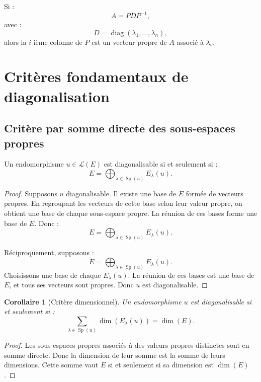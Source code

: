 \documentclass[11pt,a4paper]{article}
\newcommand{\Lcal}{\mathcal L}
\newcommand{\Sp}{\operatorname{Sp}}
\newcommand{\diag}{\operatorname{diag}}
\newtheorem{corollaire}[prop]{Corollaire}
\begin{document}
\begin{methodbox}
Si :
\[
A=PDP^{-1},
\]
avec :
\[
D=\diag(\lambda_1,\dots,\lambda_n),
\]
alors la \(i\)-ième colonne de \(P\) est un vecteur propre de \(A\) associé à \(\lambda_i\).
\end{methodbox}

\section{Critères fondamentaux de diagonalisation}

\subsection{Critère par somme directe des sous-espaces propres}

\begin{theorembox}
Un endomorphisme \(u\in\Lcal(E)\) est diagonalisable si et seulement si :
\[
E=\bigoplus_{\lambda\in\Sp(u)}E_\lambda(u).
\]
\end{theorembox}

\begin{proof}
Supposons \(u\) diagonalisable.  
Il existe une base de \(E\) formée de vecteurs propres.  
En regroupant les vecteurs de cette base selon leur valeur propre, on obtient une base de chaque sous-espace propre.  
La réunion de ces bases forme une base de \(E\).  
Donc :
\[
E=\bigoplus_{\lambda\in\Sp(u)}E_\lambda(u).
\]

Réciproquement, supposons :
\[
E=\bigoplus_{\lambda\in\Sp(u)}E_\lambda(u).
\]
Choisissons une base de chaque \(E_\lambda(u)\).  
La réunion de ces bases est une base de \(E\), et tous ses vecteurs sont propres.  
Donc \(u\) est diagonalisable.
\end{proof}

\begin{corollaire}[Critère dimensionnel]
Un endomorphisme \(u\) est diagonalisable si et seulement si :
\[
\sum_{\lambda\in\Sp(u)}\dim(E_\lambda(u))=\dim(E).
\]
\end{corollaire}

\begin{proof}
Les sous-espaces propres associés à des valeurs propres distinctes sont en somme directe.  
Donc la dimension de leur somme est la somme de leurs dimensions.  
Cette somme vaut \(E\) si et seulement si sa dimension est \(\dim(E)\).
\end{proof}
\end{document}
